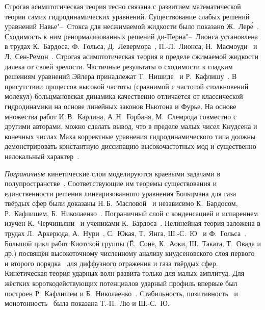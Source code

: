 Строгая асимптотическая теория тесно связана с развитием математической теории самих гидродинамических уравнений.
Существование слабых решений уравнений Навье"--~Стокса для несжимаемой жидкости было показано Ж.~Лер\'{е}~\autocite{Leray1934}.
Сходимость к ним ренормализованных решений ди-Перна"--~Лионса установлена в трудах
К.~Бардоса, Ф.~Гольса, Д.~Левермора~\autocite{Bardos1993}, П.-Л.~Лионса, Н.~Масмоуди~\autocite{Masmoudi2001} и Л.~Сен-Ремон~\autocite{Golse2004}.
Строгая асимптотическая теория в пределе сжимаемой жидкости далека от своей зрелости.
Частичные результаты о сходимости к гладким решениям уравнений Эйлера принадлежат
Т.~Нишиде~\autocite{Nishida1978} и Р.~Кафлишу~\autocite{Caflisch1980limit}.
В присутствии процессов высокой частоты (сравнимой с частотой столкновений молекул) больцмановская динамика
качественно отличается от классической гидродинамики на основе линейных законов Ньютона и Фурье.
На основе множества работ И.\,В.~Карлина, А.\,Н.~Горбаня, М.~Слемрода совместно с другими авторами,
можно сделать вывод, что в пределе малых чисел Кнудсена и конечных числах Маха корректные уравнения
гидродинамического типа должны демонстрировать константную диссипацию высокочастотных мод
и существенно нелокальный характер~\autocite{Gorban2014}.

\emph{Пограничные} кинетические слои моделируются краевыми задачами в полупространстве~\autocite{Grad1969}.
Соответствующие им теоремы существования и единственности решения линеаризованного уравнения Больцмана для газа твёрдых сфер
были доказаны Н.\,Б.~Масловой~\autocite{Maslova1982} и независимо К.~Бардосом, Р.~Кафлишем, Б.~Николаенко~\autocite{Bardos1986}.
Пограничный слой с конденсацией и испарением изучен К.~Черчиньяни~\autocite{Cercignani1986} и учениками К.~Бардоса~\autocite{Coron1988}.
Нелинейная теория заложена в трудах Л.~Аркерюда, А.~Нури~\autocite{Arkeryd2000},
С.~Юкая, Т.~Янга, Ш.-С.~Ю~\autocite{Ukai2003} и Ф.~Гольса~\autocite{Golse2008}.
Большой цикл работ Киотской группы (Ё.~Соне, К.~Аоки, Ш.~Таката, Т.~Овада и др.)
посвящён высокоточному численному анализу кнудсеновского слоя первого~\autocite{Ohwada1989creep, Ohwada1989jump}
и второго порядка~\autocite{Ohwada1992, Takata2015second, Takata2015curvature}
для диффузного отражения и газа твёрдых сфер.
Кинетическая теория ударных волн развита только для малых амплитуд.
Для жёстких короткодействующих потенциалов ударный профиль впервые был построен Р.~Кафлишем и Б.~Николаенко~\autocite{Caflisch1982}.
Cтабильность, позитивность~\autocite{Liu2004} и монотонность~\autocite{Liu2013} была показана Т.-П.~Лю и Ш.-С.~Ю.


